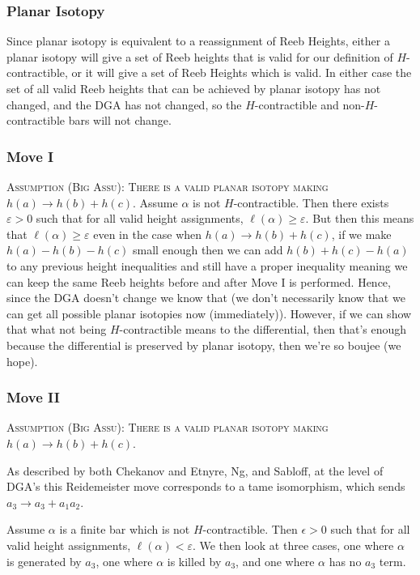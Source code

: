 \documentclass[11pt,oneside]{amsart}
\begin{document}
\subsubsection{Planar Isotopy}

Since planar isotopy is equivalent to a reassignment of Reeb Heights, either a planar isotopy will give a set of Reeb heights that is valid for our definition of $H$-contractible, or it will give a set of Reeb Heights which is valid. In either case the set of all valid Reeb heights that can be achieved by planar isotopy has not changed, and the DGA has not changed, so the $H$-contractible and non-$H$-contractible bars will not change.

\subsubsection{Move I}
{\color{red} \textsc{Assumption (Big Assu): There is a valid planar isotopy making $h(a)\rightarrow h(b)+h(c)$}.} Assume $\alpha$ is not $H$-contractible. Then there exists $\varepsilon>0$ such that for all valid height assignments, $\ell(\alpha)\geq \varepsilon$. But then this means that $\ell(\alpha)\geq \varepsilon$ even in the case when $h(a)\rightarrow h(b)+h(c)$, if we make $h(a)-h(b)-h(c)$ small enough then we can add $h(b)+h(c)-h(a)$ to any previous height inequalities and still have a proper inequality meaning we can keep the same Reeb heights before and after Move I is performed. Hence, since the DGA doesn't change we know that (we don't necessarily know that we can get all possible planar isotopies now (immediately)). However, if we can show that what not being $H$-contractible means to the differential, then that's enough because the differential is preserved by planar isotopy, then we're so boujee (we hope).




\subsubsection{Move II}
{\color{red} \textsc{Assumption (Big Assu): There is a valid planar isotopy making $h(a)\rightarrow h(b)+h(c)$}.}

As described by both Chekanov and Etnyre, Ng, and Sabloff, at the level of DGA's this Reidemeister move corresponds to a tame isomorphism, which sends $a_3 \rightarrow a_3 + a_1a_2$. 

Assume $\alpha$ is a finite bar which is not $H$-contractible. Then $\epsilon>0$ such that for all valid height assignments, $\ell(\alpha) < \varepsilon$. We then look at three cases, one where $\alpha$ is generated by $a_3$, one where $\alpha$ is killed by $a_3$, and one where $\alpha$ has no $a_3$ term.
\end{document}
